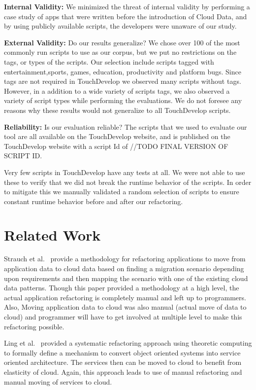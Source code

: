 \documentclass{sigplanconf}
\begin{document}
\textbf{Internal Validity:}  We minimized the threat of internal validity by performing a case study of apps that were written before the introduction of Cloud Data, and by using publicly available scripts, the developers were unaware of our study.  

\textbf{External Validity:}  Do our results generalize? We chose over 100 of the most commonly run scripts to use as our corpus, but we put no restrictions on the tags, or types of the scripts.  Our selection include scripts tagged with entertainment,sports, games, education, productivity and platform bugs.  Since tags are not required in TouchDevelop we observed many scripts without tags.  However, in a addition to a wide variety of scripts tags, we also observed a variety of script types while performing the evaluations.  We do not foresee any reasons why these results would not generalize to all TouchDevelop scripts.

\textbf{Reliability:} Is our evaluation reliable? The scripts that we used to evaluate our tool are all available on the TouchDevelop website, and \tool is published on the TouchDevelop website with a script Id of //TODO FINAL VERSION OF SCRIPT ID.

Very few scripts in TouchDevelop have any tests at all.  We were not able to use these to verify that we did not break the runtime behavior of the scripts.  In order to mitigate this we manually validated a random selection of scripts to ensure constant runtime behavior before and after our refactoring.



\section{Related Work}
\label{sec:relatedWork}

Strauch et al.~\cite{strauchmigrating} provide a methodology for refactoring applications to move from application data to cloud data based on finding a migration scenario depending upon requirements and then mapping the scenario with one of the existing cloud data patterns. Though this paper provided a methodology at a high level, the actual application refactoring is completely manual and left up to programmers. Also, Moving application data to cloud was also manual (actual move of data to cloud) and programmer will have to get involved at multiple level to make this refactoring possible.  

Ling et al.~\cite{ling2010refactoring} provided a systematic refactoring approach using theoretic computing to formally define a mechanism to convert object oriented systems into service oriented architecture. The services then can be moved to cloud to benefit from elasticity of cloud. Again, this approach leads to use of manual refactoring and manual moving of services to cloud. 
\end{document}
